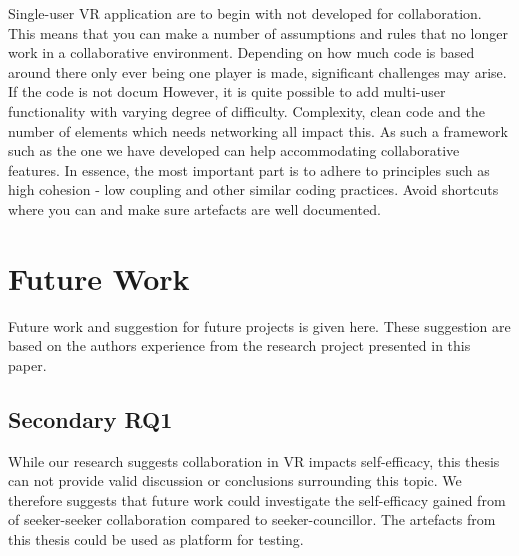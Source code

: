 Single-user VR application are to begin with not developed for collaboration. This means that you can make a number of assumptions and rules that no longer work in a collaborative environment. Depending on how much code is based around there only ever being one player is made, significant challenges may arise. If the code is not docum However, it is quite possible to add multi-user functionality with varying degree of difficulty. Complexity, clean code and the number of elements which needs networking all impact this. As such a framework such as the one we have developed can help accommodating collaborative features. In essence, the most important part is to adhere to principles such as high cohesion - low coupling and other similar coding practices. Avoid shortcuts where you can and make sure artefacts are well documented.







    
    
        


    

\section{Future Work}
Future work and suggestion for future projects is given here. These suggestion are based on the authors experience from the research project presented in this paper. 

\label{section:futureWork}

\subsection{Secondary RQ1}
While our research suggests collaboration in VR impacts self-efficacy, this thesis can not provide valid discussion or conclusions surrounding this topic. We therefore suggests that future work could investigate the self-efficacy gained from of seeker-seeker collaboration compared to seeker-councillor. The artefacts from this thesis could be used as platform for testing.  

